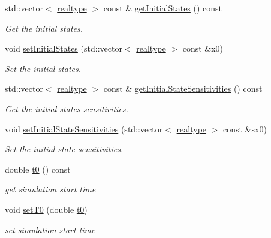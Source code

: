 \begin{DoxyCompactItemize}
std\+::vector$<$ \mbox{\hyperlink{namespaceamici_a1bdce28051d6a53868f7ccbf5f2c14a3}{realtype}} $>$ const  \& \mbox{\hyperlink{classamici_1_1_model_a34b007de55db268995bdc788accdc57d}{get\+Initial\+States}} () const
\begin{DoxyCompactList}\small\item\em Get the initial states. \end{DoxyCompactList}\item 
void \mbox{\hyperlink{classamici_1_1_model_ada7cb3dadf4cee4b8fd6f092fee54b3c}{set\+Initial\+States}} (std\+::vector$<$ \mbox{\hyperlink{namespaceamici_a1bdce28051d6a53868f7ccbf5f2c14a3}{realtype}} $>$ const \&x0)
\begin{DoxyCompactList}\small\item\em Set the initial states. \end{DoxyCompactList}\item 
std\+::vector$<$ \mbox{\hyperlink{namespaceamici_a1bdce28051d6a53868f7ccbf5f2c14a3}{realtype}} $>$ const  \& \mbox{\hyperlink{classamici_1_1_model_a989b8202ceac7b6f94bb1503519a56fb}{get\+Initial\+State\+Sensitivities}} () const
\begin{DoxyCompactList}\small\item\em Get the initial states sensitivities. \end{DoxyCompactList}\item 
void \mbox{\hyperlink{classamici_1_1_model_a82941b121d9db31d357642092a2cd41d}{set\+Initial\+State\+Sensitivities}} (std\+::vector$<$ \mbox{\hyperlink{namespaceamici_a1bdce28051d6a53868f7ccbf5f2c14a3}{realtype}} $>$ const \&sx0)
\begin{DoxyCompactList}\small\item\em Set the initial state sensitivities. \end{DoxyCompactList}\item 
double \mbox{\hyperlink{classamici_1_1_model_a223e567004c82b5facc2fe98cdd16855}{t0}} () const
\begin{DoxyCompactList}\small\item\em get simulation start time \end{DoxyCompactList}\item 
void \mbox{\hyperlink{classamici_1_1_model_aaf5053fde7e205c89d89c000a7693987}{set\+T0}} (double \mbox{\hyperlink{classamici_1_1_model_a223e567004c82b5facc2fe98cdd16855}{t0}})
\begin{DoxyCompactList}\small\item\em set simulation start time \end{DoxyCompactList}\item 

\end{DoxyCompactItemize}
